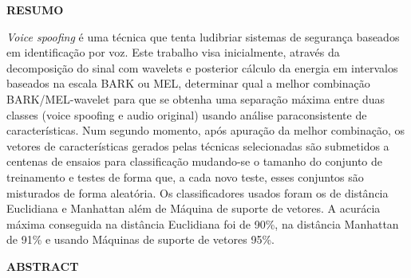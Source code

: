 \setlength{\parindent}{0pt}
\newpage \thispagestyle{empty}
\vspace{1.5cm}
\fontsize{12}{\baselineskip} \selectfont

\begin{center}
	{\huge{\textbf{RESUMO}}}
\end{center}

\begin{myenv}{1.5}
	\fontsize{12}{\baselineskip} \selectfont \onehalfspacing
	\par \null
	\par \null
	\par \textit{Voice spoofing} é uma técnica que tenta ludibriar sistemas de segurança baseados em identificação por voz. Este trabalho visa inicialmente, através da decomposição do sinal com wavelets e posterior cálculo da energia em intervalos baseados na escala BARK ou MEL, determinar qual a melhor combinação BARK/MEL-wavelet para que se obtenha uma separação máxima entre duas classes (voice spoofing e audio original) usando análise paraconsistente de características. Num segundo momento, após apuração da melhor combinação, os vetores de características gerados pelas técnicas selecionadas são submetidos a centenas de ensaios para classificação mudando-se o tamanho do conjunto de treinamento e testes de forma que, a cada novo teste, esses conjuntos são misturados de forma aleatória. Os classificadores usados foram os de distância Euclidiana e Manhattan além de Máquina de suporte de vetores. A acurácia máxima conseguida na distância Euclidiana foi de 90\%, na distância Manhattan de 91\% e usando Máquinas de suporte de vetores 95\%.
\end{myenv}

\setlength{\parindent}{0pt}
\newpage \thispagestyle{empty}
\vspace{1.5cm}
\fontsize{12}{\baselineskip} \selectfont
\begin{center}
	{\huge{\textbf{ABSTRACT}}}
\end{center}

